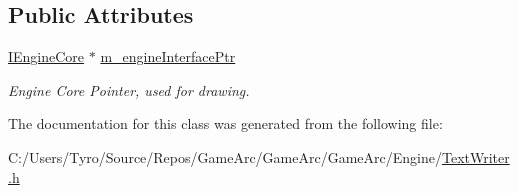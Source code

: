 \subsection*{Public Attributes}
\begin{DoxyCompactItemize}
\item 
\mbox{\label{class_text_writer_a322f1ca93660d2385928d301dfdcb379}} 
\mbox{\hyperlink{class_i_engine_core}{I\+Engine\+Core}} $\ast$ \mbox{\hyperlink{class_text_writer_a322f1ca93660d2385928d301dfdcb379}{m\+\_\+engine\+Interface\+Ptr}}
\begin{DoxyCompactList}\small\item\em Engine Core Pointer, used for drawing. \end{DoxyCompactList}\end{DoxyCompactItemize}


The documentation for this class was generated from the following file\+:\begin{DoxyCompactItemize}
\item 
C\+:/\+Users/\+Tyro/\+Source/\+Repos/\+Game\+Arc/\+Game\+Arc/\+Game\+Arc/\+Engine/\mbox{\hyperlink{_text_writer_8h}{Text\+Writer.\+h}}\end{DoxyCompactItemize}
